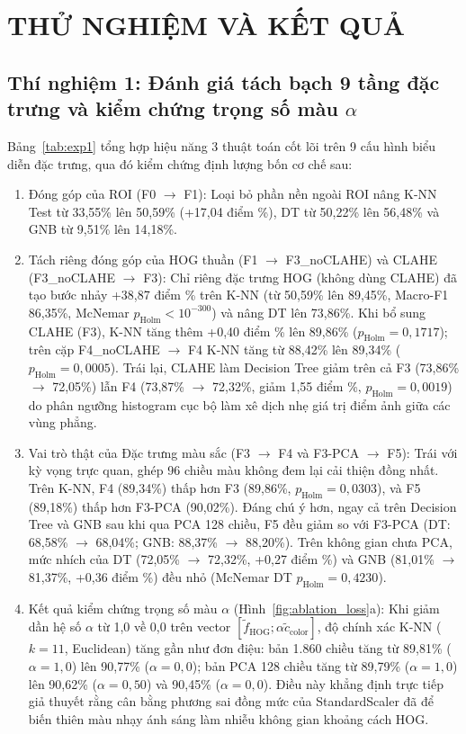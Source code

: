 \documentclass[conference]{IEEEtran}
\begin{document}
\section{THỬ NGHIỆM VÀ KẾT QUẢ}

\subsection{Thí nghiệm 1: Đánh giá tách bạch 9 tầng đặc trưng và kiểm chứng trọng số màu \texorpdfstring{$\alpha$}{alpha}}
Bảng~\ref{tab:exp1} tổng hợp hiệu năng 3 thuật toán cốt lõi trên 9 cấu hình biểu diễn đặc trưng, qua đó kiểm chứng định lượng bốn cơ chế sau:
\begin{enumerate}
  \item Đóng góp của ROI (F0 $\rightarrow$ F1): Loại bỏ phần nền ngoài ROI nâng K-NN Test từ 33,55\% lên 50,59\% (+17,04 điểm \%), DT từ 50,22\% lên 56,48\% và GNB từ 9,51\% lên 14,18\%.
  \item Tách riêng đóng góp của HOG thuần (F1 $\rightarrow$ F3\_noCLAHE) và CLAHE (F3\_noCLAHE $\rightarrow$ F3): Chỉ riêng đặc trưng HOG (không dùng CLAHE) đã tạo bước nhảy +38,87 điểm \% trên K-NN (từ 50,59\% lên 89,45\%, Macro-F1 86,35\%, McNemar $p_{\text{Holm}} < 10^{-300}$) và nâng DT lên 73,86\%. Khi bổ sung CLAHE (F3), K-NN tăng thêm +0,40 điểm \% lên 89,86\% ($p_{\text{Holm}} = 0,1717$); trên cặp F4\_noCLAHE $\rightarrow$ F4 K-NN tăng từ 88,42\% lên 89,34\% ($p_{\text{Holm}} = 0,0005$). Trái lại, CLAHE làm Decision Tree giảm trên cả F3 (73,86\% $\rightarrow$ 72,05\%) lẫn F4 (73,87\% $\rightarrow$ 72,32\%, giảm 1,55 điểm \%, $p_{\text{Holm}} = 0,0019$) do phân ngưỡng histogram cục bộ làm xê dịch nhẹ giá trị điểm ảnh giữa các vùng phẳng.
  \item Vai trò thật của Đặc trưng màu sắc (F3 $\rightarrow$ F4 và F3-PCA $\rightarrow$ F5): Trái với kỳ vọng trực quan, ghép 96 chiều màu không đem lại cải thiện đồng nhất. Trên K-NN, F4 (89,34\%) thấp hơn F3 (89,86\%, $p_{\text{Holm}} = 0,0303$), và F5 (89,18\%) thấp hơn F3-PCA (90,02\%). Đáng chú ý hơn, ngay cả trên Decision Tree và GNB sau khi qua PCA 128 chiều, F5 đều giảm so với F3-PCA (DT: 68,58\% $\rightarrow$ 68,04\%; GNB: 88,37\% $\rightarrow$ 88,20\%). Trên không gian chưa PCA, mức nhích của DT (72,05\% $\rightarrow$ 72,32\%, +0,27 điểm \%) và GNB (81,01\% $\rightarrow$ 81,37\%, +0,36 điểm \%) đều nhỏ (McNemar DT $p_{\text{Holm}} = 0,4230$).
  \item Kết quả kiểm chứng trọng số màu $\alpha$ (Hình~\ref{fig:ablation_loss}a): Khi giảm dần hệ số $\alpha$ từ 1,0 về 0,0 trên vector $[\tilde{f}_{\text{HOG}}; \alpha\tilde{c}_{\text{color}}]$, độ chính xác K-NN ($k=11$, Euclidean) tăng gần như đơn điệu: bản 1.860 chiều tăng từ 89,81\% ($\alpha=1{,}0$) lên 90,77\% ($\alpha=0{,}0$); bản PCA 128 chiều tăng từ 89,79\% ($\alpha=1{,}0$) lên 90,62\% ($\alpha=0{,}50$) và 90,45\% ($\alpha=0{,}0$). Điều này khẳng định trực tiếp giả thuyết rằng cân bằng phương sai đồng mức của StandardScaler đã để biến thiên màu nhạy ánh sáng làm nhiễu không gian khoảng cách HOG.
\end{enumerate}
\end{document}
